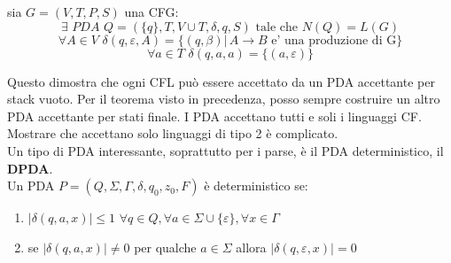 	\begin{theorem}
		sia $G=(V,T,P,S)$ una CFG:
		$$\exists\,\, PDA\,\,Q=(\{q\},T,V\cup T,\delta,q,S)\mbox{ tale che }N(Q)=L(G)$$
		$$\forall A\in V\,\,\delta(q,\varepsilon,A)=\{(q,\beta)|\,A\to B\mbox{ e' una produzione di G}\}$$
		$$\forall a\in T\,\,\delta(q,a,a)=\{(a,\varepsilon)\}$$
	\end{theorem}
	Questo dimostra che ogni CFL può essere accettato da un PDA accettante per stack vuoto. Per il teorema visto in precedenza, posso sempre costruire un altro PDA accettante per stati finale. I PDA accettano tutti e soli i linguaggi CF. Mostrare che accettano solo linguaggi di tipo 2 è complicato.\\
	Un tipo di PDA interessante, soprattutto per i parse, è il PDA deterministico, il \textbf{DPDA}.\\
	Un PDA $P=(Q,\Sigma,\Gamma,\delta,q_0,z_0,F)$ è deterministico se:
	\begin{enumerate}
		\item $|\delta(q,a,x)|\leq 1$ $\forall q\in Q,\forall a\in\Sigma\cup\{\varepsilon\},\forall x\in \Gamma$
		\item se $|\delta(q,a,x)|\neq 0$ per qualche $a\in \Sigma$ allora $|\delta(q,\varepsilon,x)|=0$
	\end{enumerate}
